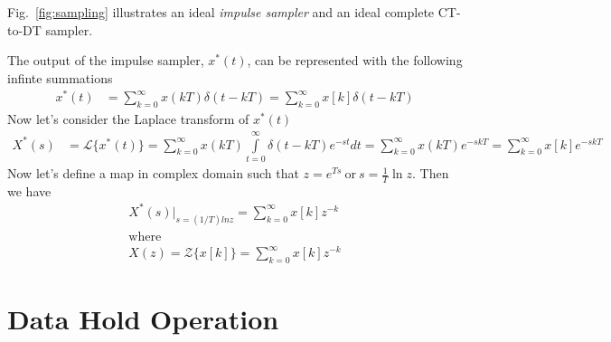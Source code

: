 \documentclass[twoside]{article}
\begin{document}
Fig.~\ref{fig:sampling} illustrates an ideal \textit{impulse sampler}
and an ideal complete CT-to-DT sampler.

The output of the impulse sampler, $x^*(t)$, can be represented with
the following infinte summations
%
\begin{align*}
  x^*(t) &= \sum\limits_{k=0}^{\infty} x(kT) \delta(t - kT) =
          \sum\limits_{k=0}^{\infty} x[k] \delta(t - kT) 
\end{align*}
Now let's consider the Laplace transform of $x^*(t)$
%
\begin{align*}
  X^*(s) &= \mathcal{L} \lbrace x^*(t) \rbrace =
\sum\limits_{k=0}^{\infty} x(kT) 
  \int\limits_{t=0}^{\infty} \delta(t - kT) e^{-s t} dt
    = \sum\limits_{k=0}^{\infty} x(kT) e^{-s kT}
 = \sum\limits_{k=0}^{\infty} x[k] e^{-s kT}
\end{align*}
%
Now let's define a map in complex domain
such that $z = e^{Ts} \ \mathrm{or} \ s = \frac{1}{T} \ln z$.
Then we have
%
\begin{align*}
  X^*(s)|_{s = (1/T) ln z} = \sum\limits_{k=0}^{\infty} x[k] z^{-k} 
\\
\mathrm{where }
\\
  X(z) = \mathcal{Z} \lbrace x[k] \rbrace = \sum\limits_{k=0}^{\infty} x[k] z^{-k} 
\end{align*}

\section*{Data Hold Operation}
\end{document}
